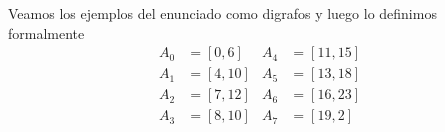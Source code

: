 \documentclass[12pt, a4paper]{report}
\theoremstyle{definition} %
\begin{document}
Veamos los ejemplos del enunciado como digrafos y luego lo definimos formalmente
\begin{align*}
    A_0 &= [0, 6]   & A_4 &= [11, 15]\\
    A_1 &= [4, 10]  & A_5 &= [13, 18]\\
    A_2 &= [7, 12]  & A_6 &= [16, 23]\\
    A_3 &= [8, 10]  & A_7 &= [19, 2]
\end{align*}

\newcommand{\interval}[4]{
    \draw (#2, #1) -- (#3, #1) node[ulabel]{#4};
    \draw[fill=white] (#2, #1) circle (0.25);
    \fill (#3, #1) circle (0.25);
}

\newcommand{\loopinterval}[4]{
    \draw (#2, #1) -- (23, #1) node[ulabel]{#4};
    \draw (0, #1) -- (#3, #1) node[ulabel]{#4};
    \draw[fill=white] (#2, #1) circle (0.25);
    \fill (#3, #1) circle (0.25);
}
\end{document}
